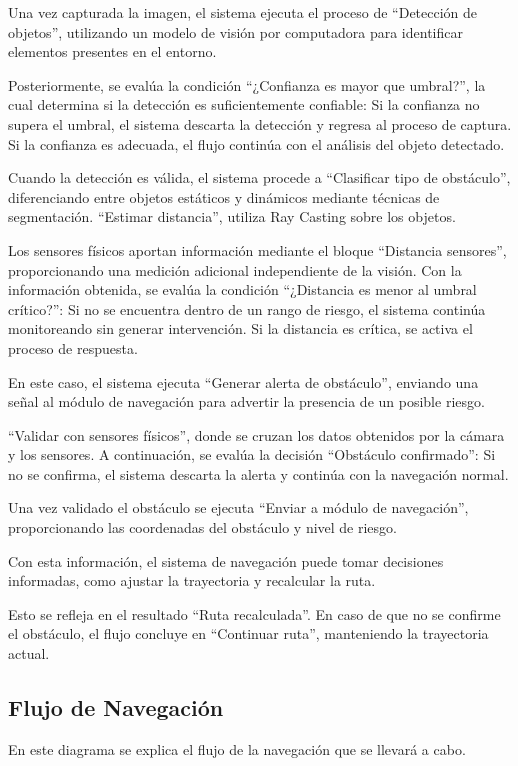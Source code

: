 Una vez capturada la imagen, el sistema ejecuta el proceso de “Detección de objetos”, utilizando un modelo de visión por computadora para identificar elementos presentes en el entorno.

Posteriormente, se evalúa la condición “¿Confianza es mayor que umbral?”, la cual determina si la detección es suficientemente confiable:
Si la confianza no supera el umbral, el sistema descarta la detección y regresa al proceso de captura.
Si la confianza es adecuada, el flujo continúa con el análisis del objeto detectado.

Cuando la detección es válida, el sistema procede a “Clasificar tipo de obstáculo”, diferenciando entre objetos estáticos y dinámicos mediante técnicas de segmentación.
“Estimar distancia”, utiliza Ray Casting  sobre los objetos.

Los sensores físicos aportan información mediante el bloque “Distancia sensores”, proporcionando una medición adicional independiente de la visión.
Con la información obtenida, se evalúa la condición “¿Distancia es menor al umbral crítico?”:
Si no se encuentra dentro de un rango de riesgo, el sistema continúa monitoreando sin generar intervención.
Si la distancia es crítica, se activa el proceso de respuesta.

En este caso, el sistema ejecuta “Generar alerta de obstáculo”, enviando una señal al módulo de navegación para advertir la presencia de un posible riesgo.

“Validar con sensores físicos”, donde se cruzan los datos obtenidos por la cámara y los sensores.
A continuación, se evalúa la decisión “Obstáculo confirmado”:
Si no se confirma, el sistema descarta la alerta y continúa con la navegación normal.

Una vez validado el obstáculo se ejecuta “Enviar a módulo de navegación”, proporcionando las coordenadas del obstáculo y nivel de riesgo.

Con esta información, el sistema de navegación puede tomar decisiones informadas, como ajustar la trayectoria y recalcular la ruta.

Esto se refleja en el resultado “Ruta recalculada”. En caso de que no se confirme el obstáculo, el flujo concluye en “Continuar ruta”, manteniendo la trayectoria actual.

\subsection{Flujo de Navegación}
En este diagrama se explica el flujo de la navegación que se llevará a cabo.

